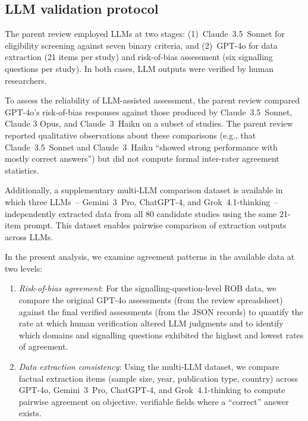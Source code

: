 \documentclass[etq]{acnsart}
\begin{document}
	\subsection{LLM validation protocol}
	\label{sec:methods_llm}
	
	The parent review employed LLMs at two stages: (1)~Claude~3.5~Sonnet for eligibility screening against seven binary criteria, and (2)~GPT-4o for data extraction (21 items per study) and risk-of-bias assessment (six signalling questions per study). In both cases, LLM outputs were verified by human researchers.
	
	To assess the reliability of LLM-assisted assessment, the parent review compared GPT-4o's risk-of-bias responses against those produced by Claude~3.5~Sonnet, Claude 3 Opus, and Claude~3~Haiku on a subset of studies. The parent review reported qualitative observations about these comparisons (e.g., that Claude~3.5~Sonnet and Claude~3~Haiku ``showed strong performance with mostly correct answers'') but did not compute formal inter-rater agreement statistics.
	
	Additionally, a supplementary multi-LLM comparison dataset is available in which three LLMs~-- Gemini~3~Pro, ChatGPT-4, and Grok~4.1-thinking~-- independently extracted data from all 80 candidate studies using the same 21-item prompt. This dataset enables pairwise comparison of extraction outputs across LLMs.
	
	In the present analysis, we examine agreement patterns in the available data at two levels:
	
	\begin{enumerate}[noitemsep]
		\item \textit{Risk-of-bias agreement}: For the signalling-question-level ROB data, we compare the original GPT-4o assessments (from the review spreadsheet) against the final verified assessments (from the JSON records) to quantify the rate at which human verification altered LLM judgments and to identify which domains and signalling questions exhibited the highest and lowest rates of agreement.
		
		\item \textit{Data extraction consistency}: Using the multi-LLM dataset, we compare factual extraction items (sample size, year, publication type, country) across GPT-4o, Gemini~3~Pro, ChatGPT-4, and Grok~4.1-thinking to compute pairwise agreement on objective, verifiable fields where a ``correct'' answer exists.
	\end{enumerate}
	
\end{document}
